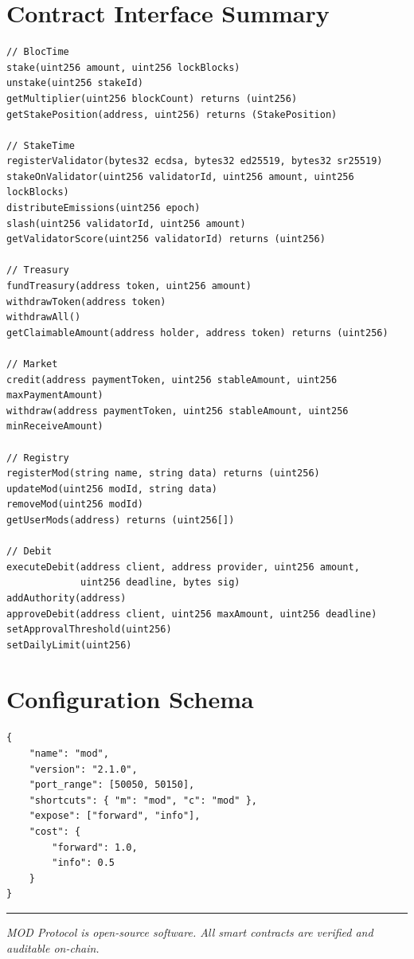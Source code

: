 \documentclass[11pt,a4paper]{article}
\begin{document}
\appendix

\section{Contract Interface Summary}
\label{app:interfaces}

\begin{lstlisting}[style=solidity]
// BlocTime
stake(uint256 amount, uint256 lockBlocks)
unstake(uint256 stakeId)
getMultiplier(uint256 blockCount) returns (uint256)
getStakePosition(address, uint256) returns (StakePosition)

// StakeTime
registerValidator(bytes32 ecdsa, bytes32 ed25519, bytes32 sr25519)
stakeOnValidator(uint256 validatorId, uint256 amount, uint256 lockBlocks)
distributeEmissions(uint256 epoch)
slash(uint256 validatorId, uint256 amount)
getValidatorScore(uint256 validatorId) returns (uint256)

// Treasury
fundTreasury(address token, uint256 amount)
withdrawToken(address token)
withdrawAll()
getClaimableAmount(address holder, address token) returns (uint256)

// Market
credit(address paymentToken, uint256 stableAmount, uint256 maxPaymentAmount)
withdraw(address paymentToken, uint256 stableAmount, uint256 minReceiveAmount)

// Registry
registerMod(string name, string data) returns (uint256)
updateMod(uint256 modId, string data)
removeMod(uint256 modId)
getUserMods(address) returns (uint256[])

// Debit
executeDebit(address client, address provider, uint256 amount,
             uint256 deadline, bytes sig)
addAuthority(address)
approveDebit(address client, uint256 maxAmount, uint256 deadline)
setApprovalThreshold(uint256)
setDailyLimit(uint256)
\end{lstlisting}

\section{Configuration Schema}
\label{app:config}

\begin{lstlisting}[basicstyle=\ttfamily\small, frame=single, backgroundcolor=\color{codebg}]
{
    "name": "mod",
    "version": "2.1.0",
    "port_range": [50050, 50150],
    "shortcuts": { "m": "mod", "c": "mod" },
    "expose": ["forward", "info"],
    "cost": {
        "forward": 1.0,
        "info": 0.5
    }
}
\end{lstlisting}


\vspace{1cm}
\noindent\rule{\textwidth}{0.4pt}
\begin{center}
\textit{MOD Protocol is open-source software. All smart contracts are verified and auditable on-chain.}
\end{center}
\end{document}
